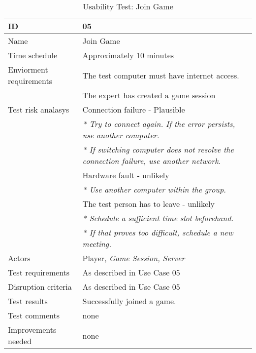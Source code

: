 {\footnotesize
\begin{table}[H]
\begin{tabular}{| p{5cm} | p{10cm} |}\hline
	\textbf{ID}	& \textbf{05} \\ \hline
	Name		& Join Game\\ \hline
	Time schedule	& Approximately 10 minutes\\ \hline
	Enviorment requirements 
		& The test computer must have internet access. \\ 
		& The expert has created a game session\\ \hline
	Test risk analasys 
		& Connection failure - Plausible \\
		& \emph{* Try to connect again. If the error persists, use another computer.} \\
		& \emph{* If switching computer does not resolve the connection failure, use another network.}\\
		& Hardware fault - unlikely \\
		& \emph{* Use another computer within the group.} \\
		& The test person has to leave - unlikely \\
		& \emph{* Schedule a sufficient time slot beforehand.} \\
		& \emph{* If that proves too difficult, schedule a new meeting.}\\ \hline
	Actors	& Player, \emph{Game Session, Server}\\ \hline
	Test requirements & As described in Use Case 05 \\ \hline
	Disruption criteria & As described in Use Case 05  \\ \hline
	Test results & Successfully joined a game. \\ \hline
	Test comments & none \\ \hline
	Improvements needed & none \\ \hline
\end{tabular}


\caption{Usability Test: Join Game}
\label{fig:usability_test_5}
\end{table}}



